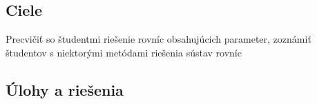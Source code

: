 
\subsection*{Ciele}

Precvičiť so študentmi riešenie rovníc obsahujúcich parameter, zoznámiť študentov s niektorými metódami riešenia sústav rovníc

\subsection*{Úlohy a riešenia}












%

%